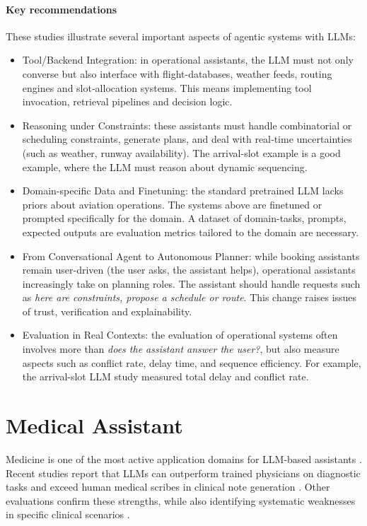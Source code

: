 \paragraph{Key recommendations}
These studies illustrate several important aspects of agentic systems with LLMs:

\begin{itemize}
    \item Tool/Backend Integration: in operational assistants, the LLM must not only converse but also interface with flight-databases, weather feeds, routing engines and slot‐allocation systems. This means implementing tool invocation, retrieval pipelines and decision logic.
    \item Reasoning under Constraints: these assistants must handle combinatorial or scheduling constraints, generate plans, and deal with real‐time uncertainties (such as weather, runway availability). The arrival-slot example is a good example, where the LLM must reason about dynamic sequencing.  
    \item Domain-specific Data and Finetuning: the standard pretrained LLM lacks priors about aviation operations. The systems above are finetuned or prompted specifically for the domain. A dataset of domain-tasks, prompts, expected outputs are evaluation metrics tailored to the domain are necessary.
    \item From Conversational Agent to Autonomous Planner: while booking assistants remain user-driven (the user asks, the assistant helps), operational assistants increasingly take on planning roles. The assistant should handle requests such as {\em here are constraints, propose a schedule or route}. This change raises issues of trust, verification and explainability.
    \item Evaluation in Real Contexts: the evaluation of operational systems often involves more than {\em does the assistant answer the user?}, but also measure aspects such as conflict rate, delay time, and sequence efficiency. For example, the arrival-slot LLM study measured total delay and conflict rate.  
\end{itemize}



\section{Medical Assistant}
Medicine is one of the most active application domains for LLM-based assistants \citep{thirunavukarasu2023large,clusmann2023future,mehandru2024evaluating}.
Recent studies report that LLMs can outperform trained physicians on diagnostic tasks
\citep{goh2024large} and exceed human medical scribes in clinical note generation
\citep{yuan2024continued}. Other evaluations confirm these strengths, while also identifying
systematic weaknesses in specific clinical scenarios \citep{panagoulias2024evaluating}.

